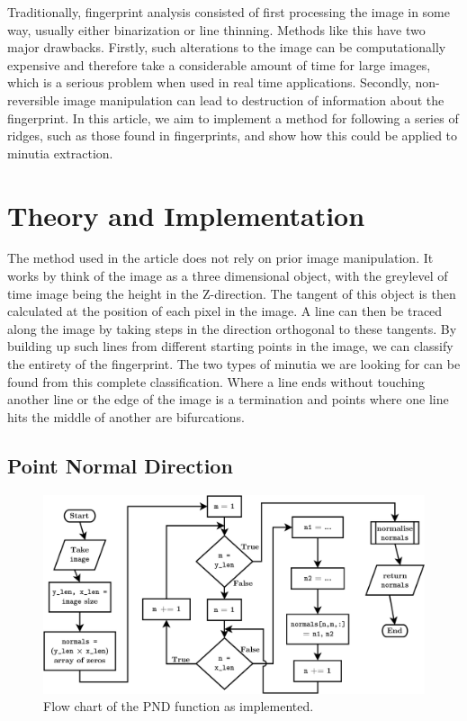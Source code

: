 \documentclass[11pt,a4paper]{article}
\begin{document}
\begin{multicols}{2}
        Traditionally, fingerprint analysis consisted of first processing the image in some way, usually either binarization or line thinning. Methods like this have two major drawbacks. Firstly, such alterations to the image can be computationally expensive and therefore take a considerable amount of time for large images, which is a serious problem when used in real time applications. Secondly, non-reversible image manipulation can lead to destruction of information about the fingerprint. In this article, we aim to implement a method for following a series of ridges, such as those found in fingerprints, and show how this could be applied to minutia extraction.



\section{Theory and Implementation}


        The method used in the article does not rely on prior image manipulation. It works by think of the image as a three dimensional object, with the greylevel of time image being the height in the Z-direction. The tangent of this object is then calculated at the position of each pixel in the image. A line can then be traced along the image by taking steps in the direction orthogonal to these tangents. By building up such lines from different starting points in the image, we can classify the entirety of the fingerprint. The two types of minutia we are looking for can be found from this complete classification. Where a line ends without touching another line or the edge of the image is a termination and points where one line hits the middle of another are bifurcations.


	\subsection{Point Normal Direction}
\begin{figure}
\centering
\includegraphics[width = \textwidth]{PND}
\caption{Flow chart of the PND function as implemented.}
\label{fig:PND-alg}
\end{figure}



\end{multicols}
\end{document}
